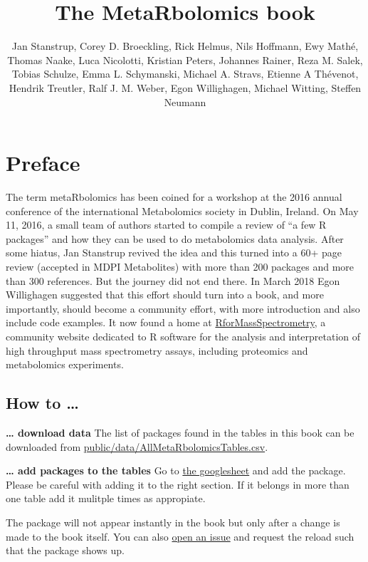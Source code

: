 \documentclass[]{article}
\title{The MetaRbolomics book}
\author{Jan Stanstrup, Corey D. Broeckling, Rick Helmus, Nils Hoffmann, Ewy Mathé, Thomas Naake, Luca Nicolotti, Kristian Peters, Johannes Rainer, Reza M. Salek, Tobias Schulze, Emma L. Schymanski, Michael A. Stravs, Etienne A Thévenot, Hendrik Treutler, Ralf J. M. Weber, Egon Willighagen, Michael Witting, Steffen Neumann}
\date{}
\begin{document}
\maketitle

{
\setcounter{tocdepth}{2}
\tableofcontents
}
\newpage

\hypertarget{preface}{%
\section*{Preface}\label{preface}}

The term metaRbolomics has been coined for a workshop at the 2016
annual conference of the international Metabolomics society in Dublin,
Ireland. On May 11, 2016, a small team of authors started to compile a
review of ``a few R packages'' and how they can be used to do
metabolomics data analysis. After some hiatus, Jan Stanstrup revived
the idea and this turned into a 60+ page review (accepted in MDPI
Metabolites) with more than 200 packages and more than 300
references. But the journey did not end there. In March 2018 Egon
Willighagen suggested that this effort should turn into a book, and
more importantly, should become a community effort, with more
introduction and also include code examples. It now found a home at
\href{https://rformassspectrometry.github.io/RforMassSpectrometry/}{RforMassSpectrometry},
a community website dedicated to R software for the analysis and
interpretation of high throughput mass spectrometry assays, including
proteomics and metabolomics experiments.

\hypertarget{how-to}{%
\subsection*{How to \ldots{}}\label{how-to}}

\textbf{\ldots{} download data}
The list of packages found in the tables in this book can be downloaded from
\url{public/data/AllMetaRbolomicsTables.csv}.

\textbf{\ldots{} add packages to the tables}
Go to \href{https://docs.google.com/spreadsheets/d/1QTe_FhiiFEJJ7hn25V973OV3Y9up8CsiLXgZXgTg_UU/edit?usp=sharing}{the googlesheet}
and add the package. Please be careful with adding it to the right section.
If it belongs in more than one table add it mulitple times as appropiate.

The package will not appear instantly in the book but only after a change is made to
the book itself. You can also \href{https://github.com/rformassspectrometry/metaRbolomics-book/issues}{open an issue}
and request the reload such that the package shows up.
\end{document}
